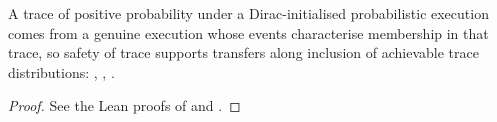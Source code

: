 \begin{theorem}
  \label{thm:trace-support}
  \leanok
  A trace of positive probability under a Dirac-initialised probabilistic execution comes from a genuine execution whose events characterise membership in that trace, so safety of trace supports transfers along inclusion of achievable trace distributions: , , .
\end{theorem}

\begin{proof}\leanok
  See the Lean proofs of  and .
\end{proof}
